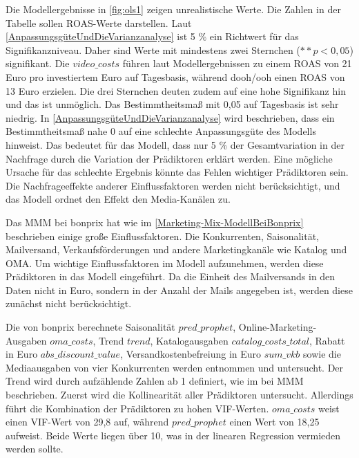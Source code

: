 Die Modellergebnisse in \autoref{fig:ols1} zeigen unrealistische Werte. Die Zahlen in der Tabelle sollen \ac{ROAS}-Werte darstellen. Laut \autoref{AnpassungsgüteUndDieVarianzanalyse} ist 5 \% ein Richtwert für das Signifikanzniveau. Daher sind Werte mit mindestens zwei Sternchen (\(**p < 0,05\)) signifikant. Die \(video\_costs\) führen laut Modellergebnissen zu einem \ac{ROAS} von 21 Euro pro investiertem Euro auf Tagesbasis, während \ac{dooh}/\ac{ooh} einen \ac{ROAS} von 13 Euro erzielen. Die drei Sternchen deuten zudem auf eine hohe Signifikanz hin und das ist unmöglich. Das Bestimmtheitsmaß mit 0,05 auf Tagesbasis ist sehr niedrig. In \autoref{AnpassungsgüteUndDieVarianzanalyse} wird beschrieben, dass ein Bestimmtheitsmaß nahe 0 auf eine schlechte Anpassungsgüte des Modells hinweist. Das bedeutet für das Modell, dass nur 5 \% der Gesamtvariation in der Nachfrage durch die Variation der Prädiktoren erklärt werden. Eine mögliche Ursache für das schlechte Ergebnis könnte das Fehlen wichtiger Prädiktoren sein. Die Nachfrageeffekte anderer Einflussfaktoren werden nicht berücksichtigt, und das Modell ordnet den Effekt den Media-Kanälen zu.\par
Das \ac{MMM} bei bonprix hat wie im \autoref{Marketing-Mix-ModellBeiBonprix} beschrieben einige große Einflussfaktoren. Die Konkurrenten, Saisonalität,  Mailversand, Verkaufsförderungen und andere Marketingkanäle wie Katalog und \ac{OMA}. Um wichtige Einflussfaktoren im Modell aufzunehmen, werden diese Prädiktoren in das Modell eingeführt. Da die Einheit des Mailversands in den Daten nicht in Euro, sondern in der Anzahl der Mails angegeben ist, werden diese zunächst nicht berücksichtigt. \par
Die von bonprix berechnete Saisonalität \(pred\_prophet\), Online-Marketing-Ausgaben \(oma\_costs\), Trend \(trend\), Katalogausgaben \(catalog\_costs\_total\), Rabatt in Euro \(abs\_discount\_value\), Versandkostenbefreiung in Euro \(sum\_vkb\) sowie die Mediaausgaben von vier Konkurrenten werden entnommen und untersucht. Der Trend wird durch aufzählende Zahlen ab 1 definiert, wie im  bei \ac{MMM} beschrieben. Zuerst wird die Kollinearität aller Prädiktoren untersucht. Allerdings führt die Kombination der Prädiktoren zu hohen \ac{VIF}-Werten. \(oma\_costs\) weist einen \ac{VIF}-Wert von 29,8 auf, während \(pred\_prophet\) einen Wert von 18,25 aufweist. Beide Werte liegen über 10, was in der linearen Regression vermieden werden sollte.
\noindent
